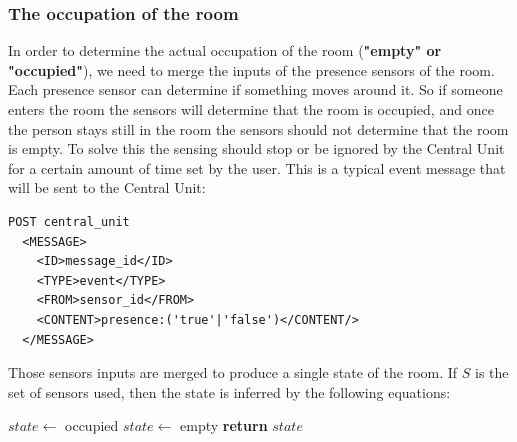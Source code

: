 \documentclass{acm_proc_article-sp}
\begin{document}
 \subsubsection*{The occupation of the room}
 In order to determine the actual occupation of the room (\textbf{"empty" or "occupied"}), we need to merge the inputs of the presence sensors of the room.
 Each presence sensor can determine if something moves around it. 
 So if someone enters the room the sensors will determine that the room is occupied, and once the person stays still in the room the sensors should not determine that the room is empty. 
 To solve this the sensing should stop or be ignored by the Central Unit for a certain amount of time set by the user.
 This is a typical event message that will be sent to the Central Unit:
 
 \begin{minipage}{\linewidth}
\begin{lstlisting}
POST central_unit 
  <MESSAGE>
    <ID>message_id</ID>
    <TYPE>event</TYPE>
    <FROM>sensor_id</FROM>
    <CONTENT>presence:('true'|'false')</CONTENT/>
  </MESSAGE> 
\end{lstlisting}
\end{minipage}

Those sensors inputs are merged to produce a single state of the room.
If $S$ is the set of sensors used, then the state is inferred by the following equations:
 \begin{description}
 \begin{algorithm}
  \begin{algorithmic}
      \State $state\gets$ occupied
    \Else
      \State $state\gets$ empty
  \EndIf
  \State \textbf{return} $state$
  \end{algorithmic}
  \end{algorithm}
 \end{description}
\end{document}
